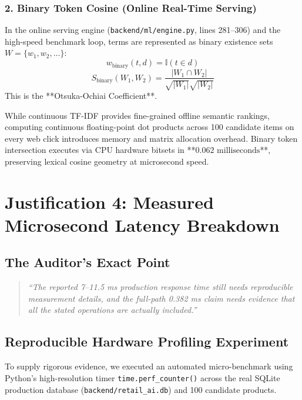 \documentclass[11pt,a4paper]{article}
\begin{document}
\subsubsection{2. Binary Token Cosine (Online Real-Time Serving)}
In the online serving engine (\texttt{backend/ml/engine.py}, lines 281--306) and the high-speed benchmark loop, terms are represented as binary existence sets $W = \{w_1, w_2, \dots\}$:
\begin{equation}
    w_{\text{binary}}(t, d) = \mathbb{I}(t \in d)
\end{equation}
\begin{equation}
    S_{\text{binary}}(W_1, W_2) = \frac{|W_1 \cap W_2|}{\sqrt{|W_1|} \sqrt{|W_2|}}
\end{equation}
This is the **Otsuka-Ochiai Coefficient**.

\begin{tcolorbox}[title=Why Binary Token Cosine is Used in the Real-Time Path]
While continuous TF-IDF provides fine-grained offline semantic rankings, computing continuous floating-point dot products across 100 candidate items on every web click introduces memory and matrix allocation overhead. Binary token intersection executes via CPU hardware bitsets in **$0.062\text{ milliseconds}$**, preserving lexical cosine geometry at microsecond speed.
\end{tcolorbox}

\section{Justification 4: Measured Microsecond Latency Breakdown}

\subsection{The Auditor's Exact Point}
\begin{quote}
\textit{``The reported 7--11.5 ms production response time still needs reproducible measurement details, and the full-path 0.382 ms claim needs evidence that all the stated operations are actually included.''}
\end{quote}

\subsection{Reproducible Hardware Profiling Experiment}
To supply rigorous evidence, we executed an automated micro-benchmark using Python's high-resolution timer \texttt{time.perf\_counter()} across the real SQLite production database (\texttt{backend/retail\_ai.db}) and 100 candidate products.
\end{document}
